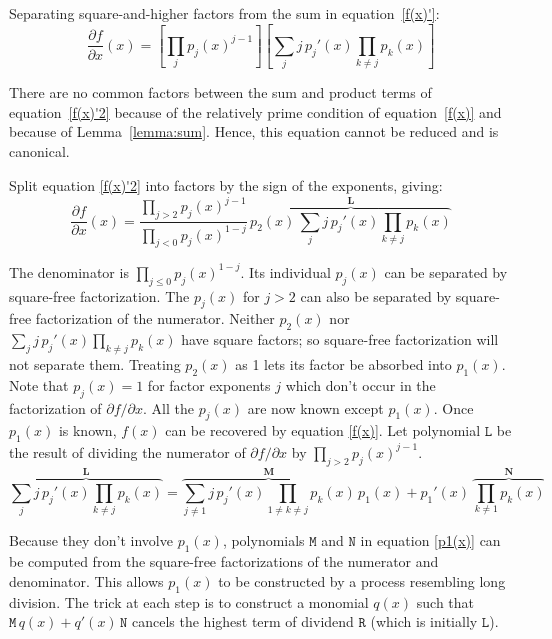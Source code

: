 \documentclass[10pt,letterpaper]{article}
\theoremstyle{proclaim}
\begin{document}
Separating square-and-higher factors from the sum in
equation~\eqref{f(x)'}:
\begin{equation}
{\frac{\partial{f}}{ \partial{x}}}(x) = \left[ \prod_j p_j(x)^{j-1} \right]
\left[\sum_j j\,{p_j'}(x)\prod_{k\neq j} p_k(x)\right]\label{f(x)'2}
\end{equation}

There are no common factors between the sum and product terms of
equation~\eqref{f(x)'2} because of the relatively prime condition of
equation~\eqref{f(x)} and because of Lemma~\ref{lemma:sum}.  Hence, this equation
cannot be reduced and is canonical.

Split equation \eqref{f(x)'2} into factors by the sign of the exponents,
giving:
\begin{equation}
{\frac{\partial{f}}{ \partial{x}}}(x)
 ={\frac{\prod_{j>2}p_j(x)^{j-1}}{\prod_{j<0} p_j(x)^{1-j}}}\,
 \overbrace{p_2(x)\,{\sum_{j}j\,{p_j'}(x)\prod_{k\neq j}p_k(x)}}^{\mathbf{L}}
\label{renum}
\end{equation}

The denominator is $\prod_{j\le0} p_j(x)^{1-j}$.  Its individual
$p_j(x)$ can be separated by square-free factorization.  The $p_j(x)$
for $j>2$ can also be separated by square-free factorization of the
numerator.  Neither $p_2(x)$ nor
${\sum_{j}j\,{p_j'}(x)\prod_{k\neq{j}}p_k(x)}$ have square factors; so
square-free factorization will not separate them.  Treating $p_2(x)$
as 1 lets its factor be absorbed into $p_1(x)$.  Note that $p_j(x)=1$
for factor exponents $j$ which don't occur in the factorization of
$\partial{f}/\partial{x}$.  All the $p_j(x)$ are now known except $p_1(x)$.  Once
$p_1(x)$ is known, $f(x)$ can be recovered by equation \eqref{f(x)}.
Let polynomial $\mathtt{L}$ be the result of dividing the numerator of
$\partial{f}/\partial{x}$ by $\prod_{j>2}p_j(x)^{j-1}$.
\begin{equation}
\overbrace{\sum_{j}j\,{p_j'}(x)\prod_{k\neq j} p_k(x)}^{\mathbf{L}}=
  \overbrace{\sum_{j\ne1}j\,{p_j'}(x)\prod_{1\neq k\neq j}p_k(x)}^{\mathbf{M}}\,p_1(x)
  +{p_1'}(x)\,\overbrace{\prod_{k\neq1}p_k(x)}^{\mathbf{N}}\label{p1(x)}
\end{equation}

Because they don't involve $p_1(x)$, polynomials $\mathtt{M}$ and
$\mathtt{N}$ in equation \eqref{p1(x)} can be computed from the
square-free factorizations of the numerator and denominator.  This
allows $p_1(x)$ to be constructed by a process resembling long
division.  The trick at each step is to construct a monomial $q(x)$
such that $\mathtt{M}\,q(x)+q'(x)\,\mathtt{N}$ cancels the highest term of
dividend $\mathtt{R}$ (which is initially $\mathtt{L}$).
\end{document}
